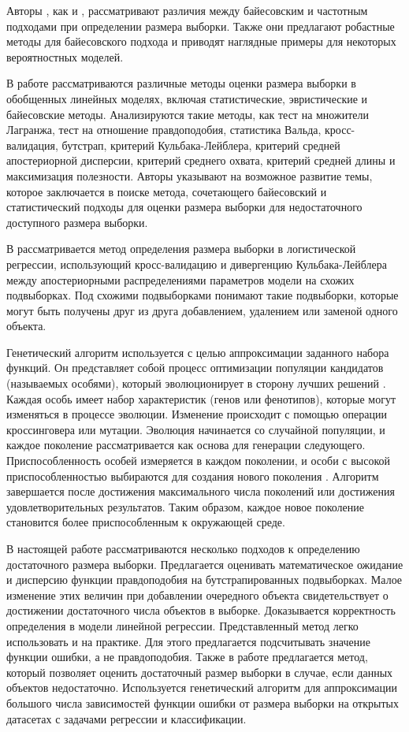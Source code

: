 Авторы \cite{Brutti2014}, как и \cite{Pezeshk2008}, рассматривают различия между байесовским и частотным подходами при определении размера выборки. Также они предлагают робастные методы для байесовского подхода и приводят наглядные примеры для некоторых вероятностных моделей.

В работе \cite{Grabovoy2022} рассматриваются различные методы оценки размера выборки в обобщенных линейных моделях, включая статистические, эвристические и байесовские методы. Анализируются такие методы, как тест на множители Лагранжа, тест на отношение правдоподобия, статистика Вальда, кросс-валидация, бутстрап, критерий Кульбака-Лейблера, критерий средней апостериорной дисперсии, критерий среднего охвата, критерий средней длины и максимизация полезности. Авторы указывают на возможное развитие темы, которое заключается в поиске метода, сочетающего байесовский и статистический подходы для оценки размера выборки для недостаточного доступного размера выборки.

В \cite{MOTRENKO2014743} рассматривается метод определения размера выборки в логистической регрессии, использующий кросс-валидацию и дивергенцию Кульбака-Лейблера между апостериорными распределениями параметров модели на схожих подвыборках. Под схожими подвыборками понимают такие подвыборки, которые могут быть получены друг из друга добавлением, удалением или заменой одного объекта.

Генетический алгоритм \citep{Goldberg1988} используется с целью аппроксимации заданного набора функций. Он представляет собой процесс оптимизации популяции кандидатов (называемых особями), который эволюционирует в сторону лучших решений \citep{Mirjalili2019}. Каждая особь имеет набор характеристик (генов или фенотипов), которые могут изменяться в процессе эволюции. Изменение происходит с помощью операции кроссинговера или мутации. Эволюция начинается со случайной популяции, и каждое поколение рассматривается как основа для генерации следующего. Приспособленность особей измеряется в каждом поколении, и особи с высокой приспособленностью выбираются для создания нового поколения \citep{Kramer2017}. Алгоритм завершается после достижения максимального числа поколений или достижения удовлетворительных результатов. Таким образом, каждое новое поколение становится более приспособленным к окружающей среде.

В настоящей работе рассматриваются несколько подходов к определению достаточного размера выборки. Предлагается оценивать математическое ожидание и дисперсию функции правдоподобия на бутстрапированных подвыборках. Малое изменение этих величин при добавлении очередного объекта свидетельствует о достижении достаточного числа объектов в выборке. Доказывается корректность определения в модели линейной регрессии. Представленный метод легко использовать и на практике. Для этого предлагается подсчитывать значение функции ошибки, а не правдоподобия. Также в работе предлагается метод, который позволяет оценить достаточный размер выборки в случае, если данных объектов недостаточно. Используется генетический алгоритм для аппроксимации большого числа зависимостей функции ошибки от размера выборки на открытых датасетах с задачами регрессии и классификации.

